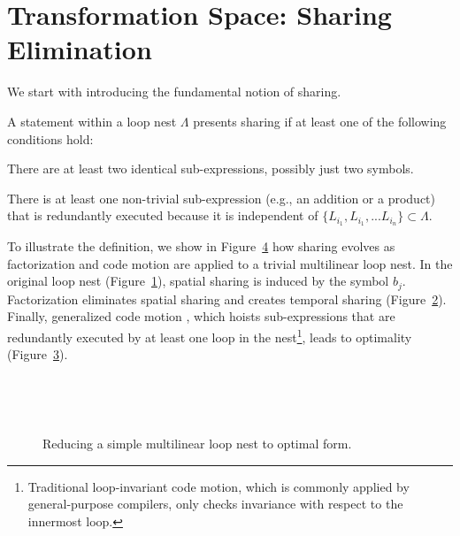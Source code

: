 \section{Transformation Space: Sharing Elimination}
\label{sec:sharing-elimination}
We start with introducing the fundamental notion of sharing.

\begin{Def}[Sharing]
A statement within a loop nest $\Lambda$ presents sharing if at least one of the following conditions hold:
\begin{description}[labelindent=0.5cm,font=\bfseries]
\item[Spatial sharing] There are at least two identical sub-expressions, possibly just two symbols.
\item[Temporal sharing] There is at least one non-trivial sub-expression (e.g., an addition or a product) that is redundantly executed because it is independent of $\lbrace L_{i_1}, L_{i_1}, ...L_{i_n} \rbrace \subset \Lambda$.
\end{description}
\end{Def}

To illustrate the definition, we show in Figure~\ref{code:multi_loopnest} how sharing evolves as factorization and code motion are applied to a trivial multilinear loop nest. In the original loop nest (Figure~\ref{code:multi_loopnest_a}), spatial sharing is induced by the symbol $b_j$. Factorization eliminates spatial sharing and creates temporal sharing (Figure~\ref{code:multi_loopnest_b}). Finally, generalized code motion \citep{Luporini-coffee}, which hoists sub-expressions that are redundantly executed by at least one loop in the nest\footnote{Traditional loop-invariant code motion, which is commonly applied by general-purpose compilers, only checks invariance with respect to the innermost loop.}, leads to optimality (Figure~\ref{code:multi_loopnest_c}). 

\begin{figure}[h]
\begin{CenteredBox}

\begin{subfigure}{0.35\textwidth}
\captionsetup{skip=20pt}

\label{code:multi_loopnest_a}
\end{subfigure}
~~
\begin{subfigure}{0.35\textwidth}
\captionsetup{skip=20pt}

\label{code:multi_loopnest_b}
\end{subfigure}
~~
\begin{subfigure}{0.34\textwidth}
\captionsetup{skip=1pt}

\label{code:multi_loopnest_c}
\end{subfigure}

\end{CenteredBox}
\caption{Reducing a simple multilinear loop nest to optimal form.}
\label{code:multi_loopnest}
\end{figure}


